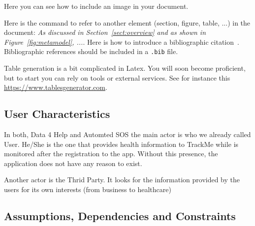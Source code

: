 Here you can see how to include an image in your document.


Here is the command to refer to another element (section, figure, table, ...) in the document: \emph{As discussed in Section~\ref{sect:overview} and as shown in Figure~\ref{fig:metamodel}, ...}. Here is how to introduce a bibliographic citation~\cite{DAM}. Bibliographic references should be included in a \texttt{.bib} file. 

Table generation is a bit complicated in Latex. You will soon become proficient, but to start you can rely on tools or external services. See for instance this \href{https://www.tablesgenerator.com}{https://www.tablesgenerator.com}. 


\subsection {User Characteristics}
In both, Data 4 Help and Automted SOS the main actor is who we already called User. He/She is the one that provides health information to TrackMe while is monitored after the registration to the app. Without this presence, the application does not have any reason to exist.

Another actor is the Thrid Party. It looks for the information provided by the users for its own interests (from business to healthcare)

\subsection{Assumptions, Dependencies and Constraints}